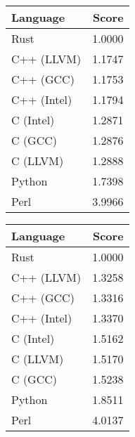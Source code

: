 \begin{subtable}{0.33\textwidth}
    \centering
    \caption{$k=3$}
    \label{table:runtime:regexp(3)}
    \begin{tabular}{|l|r|}
        \hline
        Language & Score \\
        \hline
        Rust & 1.0000 \\
        C++ (LLVM) & 1.1747 \\
        C++ (GCC) & 1.1753 \\
        C++ (Intel) & 1.1794 \\
        C (Intel) & 1.2871 \\
        C (GCC) & 1.2876 \\
        C (LLVM) & 1.2888 \\
        Python & 1.7398 \\
        Perl & 3.9966 \\
        \hline
    \end{tabular}
\end{subtable}
\begin{subtable}{0.33\textwidth}
    \centering
    \caption{$k=4$}
    \label{table:runtime:regexp(4)}
    \begin{tabular}{|l|r|}
        \hline
        Language & Score \\
        \hline
        Rust & 1.0000 \\
        C++ (LLVM) & 1.3258 \\
        C++ (GCC) & 1.3316 \\
        C++ (Intel) & 1.3370 \\
        C (Intel) & 1.5162 \\
        C (LLVM) & 1.5170 \\
        C (GCC) & 1.5238 \\
        Python & 1.8511 \\
        Perl & 4.0137 \\
        \hline
    \end{tabular}
\end{subtable}%
